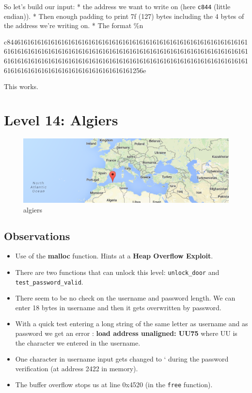 \documentclass[a4paper,11pt]{article}
\begin{document}
So let's build our input: * the address we want to write on (here
\texttt{c844} (little endian)). * Then enough padding to print 7f (127)
bytes including the 4 bytes of the address we're writing on. * The
format \%n

c8446161616161616161616161616161616161616161616161616161616161616161616161616161616161616161616161616161616161616161616161616161616161616161616161616161616161616161616161616161616161616161616161616161616161616161616161616161616161616161616161616161616161256e

This works.

\section{Level 14: Algiers}\label{level-14-algiers}

\begin{figure}[htbp]
\centering
\includegraphics{img/14_1.PNG}
\caption{algiers}
\end{figure}

\subsection{Observations}\label{observations-1}

\begin{itemize}
\itemsep1pt\parskip0pt
\item
  Use of the \textbf{malloc} function. Hints at a \textbf{Heap Overflow
  Exploit}.
\item
  There are two functions that can unlock this level:
  \texttt{unlock\_door} and \texttt{test\_password\_valid}.
\item
  There seem to be no check on the username and password length. We can
  enter 18 bytes in username and then it gets overwritten by password.
\item
  With a quick test entering a long string of the same letter as
  username and as password we get an error : \textbf{load address
  unaligned: UU75} where UU is the character we entered in the username.
\item
  One character in username input gets changed to ` during the password
  verification (at address 2422 in memory).
\item
  The buffer overflow stops us at line 0x4520 (in the \texttt{free}
  function).
\end{itemize}
\end{document}
